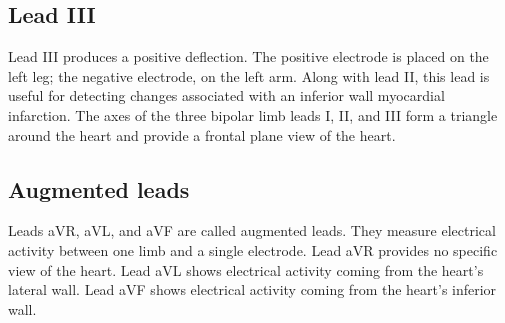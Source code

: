 \subsection{Lead III}
Lead III produces a positive deflection. The positive electrode is placed on the left leg; the negative electrode, on the left arm. Along with lead II, this lead is useful for detecting changes associated with an inferior wall myocardial infarction. The axes of the three bipolar limb leads I, II, and III form a triangle around the heart and provide a frontal plane view of the heart.

\subsection{Augmented leads}
Leads aVR, aVL, and aVF are called augmented leads. They measure electrical activity between one limb and a single electrode. Lead aVR provides no specific view of the heart. Lead aVL shows electrical activity coming from the heart’s lateral wall. Lead aVF shows electrical activity coming from the heart’s inferior wall.


